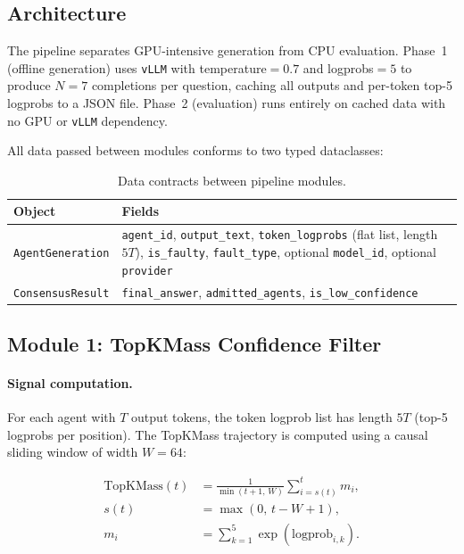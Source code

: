 \documentclass[11pt]{article}
\begin{document}
\subsection{Architecture}
\label{sec:arch}

The pipeline separates GPU-intensive generation from CPU evaluation. Phase~1
(offline generation) uses \texttt{vLLM} with temperature$=0.7$ and logprobs$=5$
to produce $N=7$ completions per question, caching all outputs and per-token
top-5 logprobs to a JSON file. Phase~2 (evaluation) runs entirely on cached
data with no GPU or \texttt{vLLM} dependency.

All data passed between modules conforms to two typed dataclasses:

\begin{table}[t]
\centering
\caption{Data contracts between pipeline modules.}
\label{tab:data-contracts}
\scriptsize
\begin{tabularx}{\columnwidth}{lX}
\toprule
\textbf{Object} & \textbf{Fields} \\
\midrule
\texttt{AgentGeneration}
  & \texttt{agent\_id}, \texttt{output\_text}, \texttt{token\_logprobs}
    (flat list, length $5T$), \texttt{is\_faulty}, \texttt{fault\_type},
    optional \texttt{model\_id}, optional \texttt{provider} \\
\texttt{ConsensusResult}
  & \texttt{final\_answer}, \texttt{admitted\_agents}, \texttt{is\_low\_confidence} \\
\bottomrule
\end{tabularx}
\end{table}

\subsection{Module 1: TopKMass Confidence Filter}
\label{sec:module1}

\paragraph{Signal computation.}
For each agent with $T$ output tokens, the token logprob list has length $5T$
(top-5 logprobs per position). The TopKMass trajectory is computed using a
causal sliding window of width $W=64$:

\begin{equation}
\begin{aligned}
\mathrm{TopKMass}(t)
  &= \frac{1}{\min(t+1,\,W)}
     \sum_{i=s(t)}^{t} m_i, \\
s(t) &= \max(0,\,t-W+1), \\
m_i &= \sum_{k=1}^{5} \exp(\mathrm{logprob}_{i,k}).
\end{aligned}
\label{eq:topkmass}
\end{equation}
\end{document}
